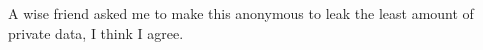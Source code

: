 
\begin{acknowledgements}

A wise friend asked me to make this anonymous to leak the least amount of private data, I think I agree.

\end{acknowledgements}


